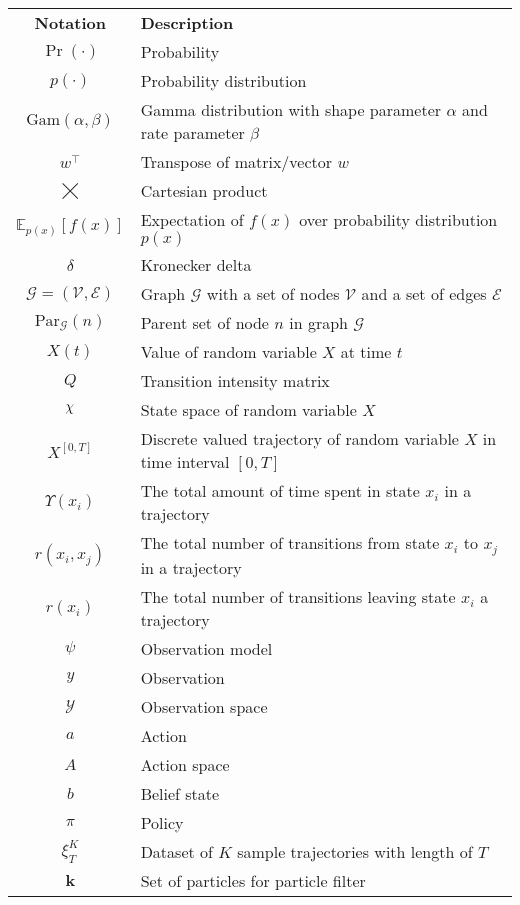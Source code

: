 \begin{tabular}{c p{}}
	\textbf{Notation} & \textbf{Description}\\
	$ \operatorname{Pr}(\cdot) $ & Probability \\
	$ p(\cdot) $ & Probability distribution \\
	$ \mathrm{Gam}(\alpha, \beta)  $ & Gamma distribution with shape parameter $ \alpha $ and rate parameter $ \beta $\\
	$ w^\intercal $ & Transpose of matrix/vector $ w $ \\
	$ \bigtimes $ & Cartesian product \\
	$ \mathbb{E}_{p(x)}\left[ f(x) \right]  $ & Expectation of $ f(x) $ over probability distribution $ p(x) $\\
	$ \delta  $ & Kronecker delta\\
	$ \mathcal{G} = (\mathcal{V}, \mathcal{E})  $ & Graph $ \mathcal{G} $ with a set of nodes $ \mathcal{V} $ and a set of edges $ \mathcal{E} $\\
	$ \mathrm{Par}_{\mathcal{G}}(n)  $ & Parent set of node $ n $ in graph $ \mathcal{G} $ \\
	$ X(t) $ & Value of random variable $X$ at time $ t $ \\
	$ Q $ & Transition intensity matrix \\
	$ \rchi $ & State space of random variable $ X $ \\
	$ X^{[0, T]} $ & Discrete valued trajectory of random variable $ X $ in time interval $ [0, T] $ \\
	$ \Upsilon(x_i) $ & The total amount of time spent in state $ x_i $ in a trajectory \\
	$ r(x_i, x_j)  $ & The total number of transitions from state $ x_i $ to $ x_j $ in a trajectory \\
	$ r(x_i)  $ & The total number of transitions leaving state $ x_i $ a trajectory \\
	$ \psi $ & Observation model \\
	$ y $ & Observation \\
	$ \mathcal{Y} $ & Observation space \\
	$ a $ & Action \\
	$ A $ & Action space \\
	$ b $ & Belief state \\
	$ \pi $ & Policy \\
	$ \xi^K_T $ & Dataset of $ K $ sample trajectories with length of $ T $\\
	$ \textbf{k} $ & Set of particles for particle filter
\end{tabular}\\

